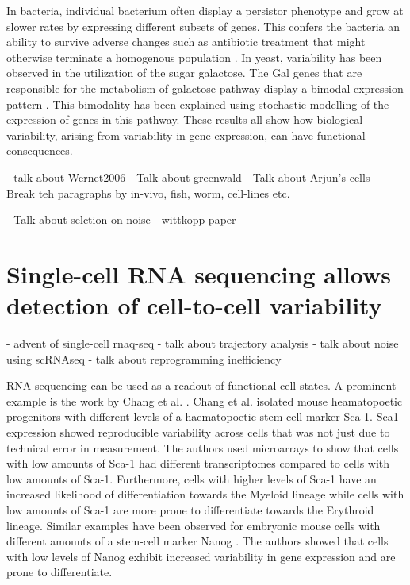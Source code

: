 In bacteria, individual bacterium often display a persistor phenotype and grow at slower rates by expressing different subsets of genes. This confers the bacteria an ability to survive adverse changes such as antibiotic treatment that might otherwise terminate a homogenous population \cite{veening_bet-hedging_2008}. In yeast, variability has been observed in the utilization of the sugar galactose. The Gal genes that are responsible for the metabolism of galactose pathway display a bimodal expression pattern \cite{acar_enhancement_2005}. This bimodality has been explained using stochastic modelling of the expression of genes in this pathway. These results all show how biological variability, arising from variability in gene expression, can have functional consequences. 

- talk about Wernet2006
- Talk about greenwald
- Talk about Arjun's cells
- Break teh paragraphs by in-vivo, fish, worm, cell-lines etc.

- Talk about selction on noise
- wittkopp paper

\section{Single-cell RNA sequencing allows detection of cell-to-cell variability}

- advent of single-cell rnaq-seq
- talk about trajectory analysis
- talk about noise using scRNAseq
- talk about reprogramming inefficiency

RNA sequencing can be used as a readout of functional cell-states. A prominent example is the work by Chang et al.  \cite{chang_transcriptome-wide_2008}. Chang et al. isolated mouse heamatopoetic progenitors with different levels of a haematopoetic stem-cell marker Sca-1.  Sca1 expression showed reproducible variability across cells that was not just due to technical error in measurement. The authors used microarrays to show that cells with low amounts of Sca-1 had different transcriptomes compared to cells with low amounts of Sca-1. Furthermore, cells with higher levels of Sca-1 have an increased likelihood of differentiation towards the Myeloid lineage while cells with low amounts of Sca-1 are more prone to differentiate towards the Erythroid lineage. Similar examples have been observed for embryonic mouse cells with different amounts of a stem-cell marker Nanog \cite{kalmar_regulated_2009}. The authors showed that cells with low levels of Nanog exhibit increased variability in gene expression and are prone to differentiate.

